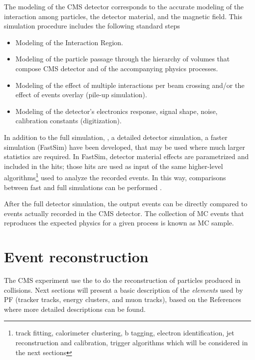 The modeling of the CMS detector corresponds to the accurate modeling of the interaction among particles, the detector material, and the magnetic field. This simulation procedure includes the following standard steps
\begin{itemize}
\item Modeling of the Interaction Region.
\item Modeling of the particle passage through the hierarchy of volumes that compose CMS detector and of the accompanying physics processes.
\item Modeling of the effect of multiple interactions per beam crossing and/or the effect of events overlay (pile-up simulation).
\item Modeling of the detector's electronics response, signal shape, noise, calibration constants (digitization). 
\end{itemize}

In addition to the full simulation, \ie, a detailed detector simulation, a faster simulation (FastSim) have been developed, that may be used where much larger statistics are required. In FastSim, detector material effects are parametrized and included in the hits; those hits are used as input of the same higher-level algorithms\footnote{track fitting, calorimeter clustering, b tagging, electron identification, jet reconstruction and calibration, trigger algorithms which will be considered in the next sections} used to analyze the recorded events. In this way, comparisons between fast and full simulations can be performed \cite{fastsim}.

After the full detector simulation, the output events can be directly compared to events actually recorded in the CMS detector. The collection of MC events that reproduces the expected physics for a given process is known as MC sample.

\section{Event reconstruction}

The CMS experiment use the  to do the reconstruction of particles produced in \pp collisions. Next sections will present a basic description of the \textit{elements} used by PF (tracker tracks, energy clusters, and muon tracks), based on the References \cite{particle_flow, particle_flow2} where more detailed descriptions can be found.  

